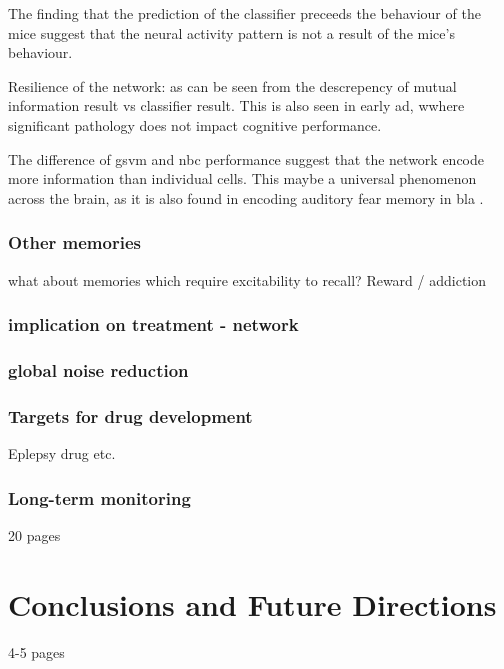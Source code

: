The finding that the prediction of the classifier preceeds the behaviour of the mice suggest that the neural activity pattern is not a result of the mice's behaviour.  

Resilience of the network: as can be seen from the descrepency of mutual information result vs classifier result. This is also seen in early \gls{ad}, wwhere significant pathology does not impact cognitive performance. 

The difference of \gls{gsvm} and \gls{nbc} performance suggest that the network encode more information than individual cells. This maybe a universal phenomenon across the brain, as it is also found in encoding auditory fear memory in \gls{bla} . 

\subsection{Other memories}
what about memories which require excitability to recall?
Reward / addiction

\subsection{implication on treatment - network}
\subsection{global noise reduction}
\subsection{Targets for drug development}
Eplepsy drug etc.
\subsection{Long-term monitoring}

20 pages

\chapter{Conclusions and Future Directions}
4-5 pages
